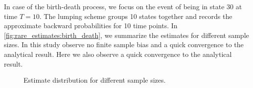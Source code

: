 In case of the birth-death process, we focus on the event of being in state \num{30} at time $T=10$.
The lumping scheme groups \num{10} states together and records the approximate backward probabilities for \num{10} time points.
In \autoref{fig:rare_estimates:birth_death}, we summarize the estimates for different sample sizes.
In this study observe no finite sample bias and a quick convergence to the analytical result.
Here we also observe a quick convergence to the analytical result.
\begin{figure}[htb]
    \centering
    \caption[Estimate distribution for different sample sizes]{\label{fig:rare_estimates}Estimate distribution for different sample sizes.}
\end{figure}
